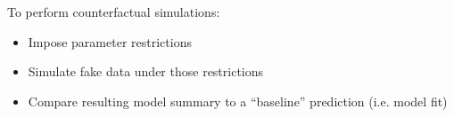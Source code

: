 \documentclass[aspectratio=169]{beamer}
\begin{document}
\begin{frame}

To perform counterfactual simulations:

\bigskip{}

\begin{itemize}
\itemsep1.5em
\item<2-> Impose parameter restrictions
\item<3-> Simulate fake data under those restrictions
\item<4-> Compare resulting model summary to a ``baseline'' prediction (i.e. model fit)
\end{itemize}

\bigskip{}


\bigskip{}


\end{frame}
\end{document}
